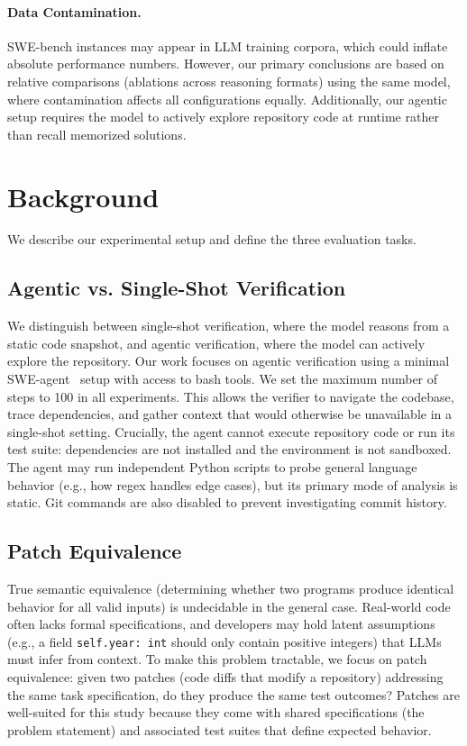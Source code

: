 \documentclass[]{meta}
\begin{document}
\paragraph{Data Contamination.} SWE-bench instances may appear in LLM training corpora, which could inflate absolute performance numbers. However, our primary conclusions are based on relative comparisons (ablations across reasoning formats) using the same model, where contamination affects all configurations equally. Additionally, our agentic setup requires the model to actively explore repository code at runtime rather than recall memorized solutions.

\section{Background}
\label{sec:background}

We describe our experimental setup and define the three evaluation tasks.

\subsection{Agentic vs. Single-Shot Verification}
We distinguish between single-shot verification, where the model reasons from a static code snapshot, and agentic verification, where the model can actively explore the repository.
Our work focuses on agentic verification using a minimal SWE-agent~\cite{yang2024sweagent} setup with access to bash tools.
We set the maximum number of steps to 100 in all experiments. This allows the verifier to navigate the codebase, trace dependencies, and gather context that would otherwise be unavailable in a single-shot setting.
Crucially, the agent cannot execute repository code or run its test suite: dependencies are not installed and the environment is not sandboxed. The agent may run independent Python scripts to probe general language behavior (e.g., how regex handles edge cases), but its primary mode of analysis is static. Git commands are also disabled to prevent investigating commit history.

\subsection{Patch Equivalence}
True semantic equivalence (determining whether two programs produce identical behavior for all valid inputs) is undecidable in the general case. Real-world code often lacks formal specifications, and developers may hold latent assumptions (e.g., a field \texttt{self.year: int} should only contain positive integers) that LLMs must infer from context. To make this problem tractable, we focus on patch equivalence: given two patches (code diffs that modify a repository) addressing the same task specification, do they produce the same test outcomes? Patches are well-suited for this study because they come with shared specifications (the problem statement) and associated test suites that define expected behavior.
\end{document}
